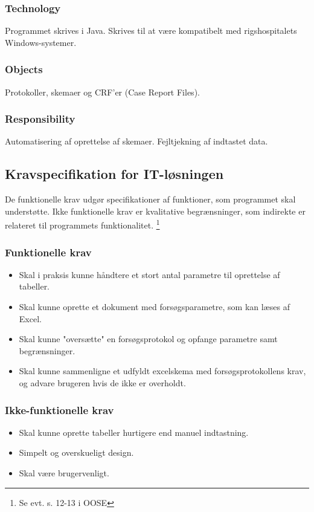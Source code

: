 \documentclass[11pt]{article}
\begin{document}
\subsubsection{Technology}
Programmet skrives i Java. Skrives til at være kompatibelt med rigshospitalets Windows-systemer.
\subsubsection{Objects}
Protokoller, skemaer og CRF'er (Case Report Files).
\subsubsection{Responsibility}
Automatisering af oprettelse af skemaer. Fejltjekning af indtastet data.

\subsection{Kravspecifikation for IT-løsningen}
De funktionelle krav udgør specifikationer af funktioner, som programmet skal understøtte. Ikke funktionelle krav er kvalitative begrænsninger, som indirekte er relateret til programmets funktionalitet. \footnote{Se evt. s. 12-13 i OOSE\cite{OOSE}}
\subsubsection{Funktionelle krav}
\begin{itemize}
  \item Skal i praksis kunne håndtere et stort antal parametre til oprettelse af tabeller.
  \item Skal kunne oprette et dokument med forsøgsparametre, som kan læses af Excel.
  \item Skal kunne "oversætte" en forsøgsprotokol og opfange parametre samt begrænsninger.
  \item Skal kunne sammenligne et udfyldt excelskema med forsøgsprotokollens krav, og advare brugeren hvis de ikke er overholdt.
\end{itemize}
\subsubsection{Ikke-funktionelle krav}
\begin{itemize}
  \item Skal kunne oprette tabeller hurtigere end manuel indtastning.
  \item Simpelt og overskueligt design.
  \item Skal være brugervenligt.
\end{itemize}
\pagebreak
\end{document}
